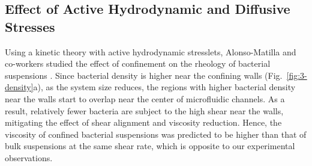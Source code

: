 \subsection{Effect of Active Hydrodynamic and Diffusive Stresses}

Using a kinetic theory with active hydrodynamic stresslets, Alonso-Matilla and co-workers studied the effect of confinement
on the rheology of bacterial suspensions \cite{Alonso-Matilla2016}. Since bacterial density is higher near the confining walls (Fig.~\ref{fig:3-density}a), as the system size reduces, the regions with higher bacterial density near the walls start to overlap near the center of microfluidic channels. As a result, relatively fewer bacteria are subject to the high shear near the walls, mitigating the effect of shear alignment and viscosity reduction. Hence, the viscosity of confined bacterial suspensions was predicted
to be higher than that of bulk suspensions at the same shear rate, which is opposite to our experimental observations.

